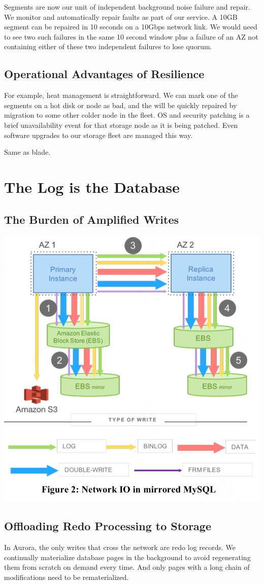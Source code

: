 \documentclass[11pt]{article}
\begin{document}
Segments are now our unit of independent background noise failure and repair. We monitor and
automatically repair faults as part of our service. A 10GB segment can be repaired in 10 seconds on a
10Gbps network link. We would need to see two such failures in the same 10 second window plus a
failure of an AZ not containing either of these two independent failures to lose quorum.
\subsection{Operational Advantages of Resilience}
\label{sec:org6d42ab3}
For example, heat management is straightforward. We can mark one of the segments on a hot disk or node
as bad, and the  will be quickly repaired by migration to some other colder node in the fleet. OS and
security patching is a brief unavailability event for that storage node as it is being patched. Even
software upgrades to our storage fleet are managed this way.

Same as blade.
\section{The Log is the Database}
\label{sec:org21976a1}
\subsection{The Burden of Amplified Writes}
\label{sec:org00d0add}
\begin{center}
\includegraphics[width=.7\textwidth]{../../images/papers/46.png}
\label{}
\end{center}
\subsection{Offloading Redo Processing to Storage}
\label{sec:orgb53ccf8}
In Aurora, the only writes that cross the network are redo log records. We continually materialize
database pages in the background to avoid regenerating them from scratch on demand every time.
And only pages with a long chain of modifications need to be rematerialized.
\end{document}
